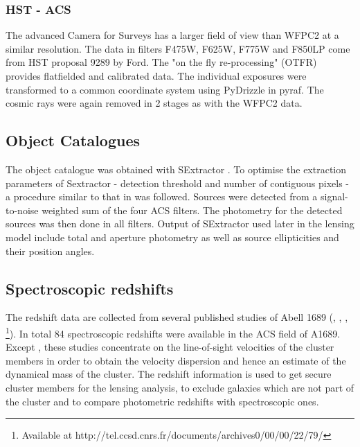 \documentclass[useAMS,usenatbib]{mn2e}
\newcounter{one}   \setcounter{one}{1}
\newcounter{four}  \setcounter{four}{4}
\begin{document}
\subsubsection{HST - ACS}
The advanced Camera for Surveys has a larger field of view than WFPC2
at a similar resolution. The data in filters F475W, F625W, F775W and
F850LP come from HST proposal 9289 by Ford. The "on the fly
re-processing" (OTFR) provides flatfielded and calibrated data. The
individual exposures were transformed to a common coordinate system
using PyDrizzle in pyraf. The cosmic rays were again removed in 2
stages as with the WFPC2 data.


\subsection{Object Catalogues}
The object catalogue was obtained with SExtractor
\citep{bertin:96}. To optimise the extraction parameters of Sextractor
- detection threshold and number of contiguous pixels - a procedure
similar to that in \citet{heidt:03} was followed. Sources were
detected from a signal-to-noise weighted sum of the four ACS filters. The
photometry for the detected sources was then done in all
filters. Output of SExtractor used later in the lensing model include
total and aperture photometry as well as source ellipticities and
their position angles.


\subsection{Spectroscopic redshifts}
The redshift data are collected from several published studies of
Abell 1689 (\citealt{girardi:97}, \citealt{balogh:02},
\citealt{duc:02}, \citealt{golse:phd}\footnote{Available at
http://tel.ccsd.cnrs.fr/documents/archives0/00/00/22/79/}).  In total
84 spectroscopic redshifts were available in the ACS field of
A1689. Except \citeauthor{golse:phd}, these studies concentrate on the
line-of-sight velocities of the cluster members in order to obtain the
velocity dispersion and hence an estimate of the dynamical mass of the
cluster. The redshift information is used to get secure cluster
members for the lensing analysis, to exclude galaxies which are not
part of the cluster and to compare photometric redshifts with
spectroscopic ones.
\end{document}
